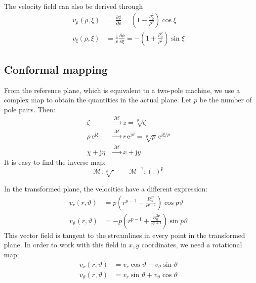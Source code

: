 \documentclass[b5paper,11pt,oneside,fleqn]{article}
\newcommand{\eu}{\mathrm{e}}
\newcommand{\je}{\mathrm{j}}
\newcommand{\te}{\vartheta}
\newcommand{\map}{\mathcal{M}}
\newcommand{\de}{\partial}
\begin{document}
The velocity field can also be derived through
\begin{equation}
\begin{aligned}
v_\rho(\rho,\xi)  &= \frac{\de\phi}{\de\rho} =
           \left( 1 - \frac{\rho_0^2}{\rho^2} \right) \cos\xi \\[1ex]
v_\xi(\rho,\xi)  &= \frac{1}{\rho} \frac{\de\phi}{\de\xi}  =
          -\left( 1 + \frac{\rho_0^2}{\rho^2} \right) \sin\xi
\end{aligned}
\end{equation}




\subsection{Conformal mapping}
From the reference plane, which is equivalent to a two-pole machine,
we use a complex map to obtain the quantities in the actual plane.
Let $ p $ be the number of pole pairs. Then:
\begin{equation}
\begin{aligned}
\zeta              &\xrightarrow{\;\map\;} z = \sqrt[p]{\zeta} \\
\rho\,\eu^{\je\xi} &\xrightarrow{\;\map\;}
                       r \, \eu^{\je\te} = \sqrt[p]{\rho}\,\eu^{\je
                       \xi/p} \\
\chi + \je\eta     &\xrightarrow{\;\map\;} x + \je y
\end{aligned}
\end{equation}
%
It is easy to find the inverse map:
\begin{equation}
\map\colon \sqrt[p]{\cdot} \qquad
\map^{-1}\colon (.)^p
\end{equation}

In the transformed plane, the velocities have a different expression:
\begin{equation}
\begin{aligned}
v_r(r,\te)  &=
p \left( r^{p-1} - \frac{R_0^{2p}}{r^{p+1}} \right) \cos p\te \\[1ex]
v_\te(r,\te)  &=
-p \left( r^{p-1} + \frac{R_0^{2p}}{r^{p+1}} \right) \sin p\te
\end{aligned}
\end{equation}
%
This vector field is tangent to the streamlines in every point in the
transformed plane. In order to work with this field in $ x,y $ coordinates, we
need a rotational map:
\begin{equation}
\begin{aligned}
v_x(r,\te) &= v_r \cos\te - v_\te \sin\te \\
v_\te(r,\te) &= v_r \sin\te + v_\te \cos\te
\end{aligned}
\end{equation}
\end{document}
